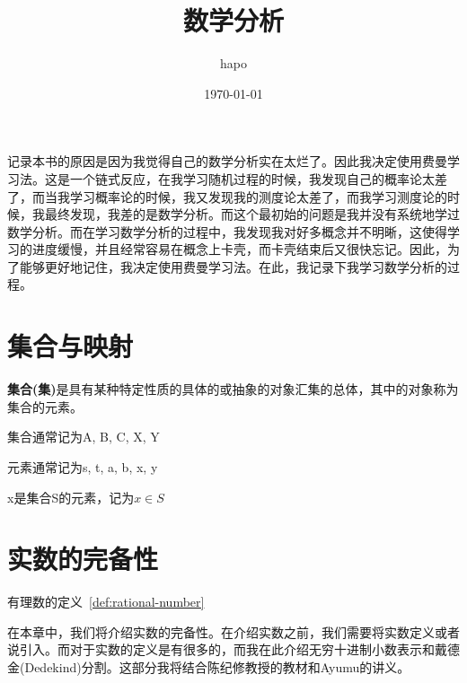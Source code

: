\documentclass[lang=cn]{elegantbook}
\title{数学分析}
\author{hapo}
\date{\today}
\begin{document}
\maketitle
\frontmatter

\tableofcontents

\mainmatter
记录本书的原因是因为我觉得自己的数学分析实在太烂了。因此我决定使用费曼学习法。这是一个链式反应，在我学习随机过程的时候，我发现自己的概率论太差了，而当我学习概率论的时候，我又发现我的测度论太差了，而我学习测度论的时候，我最终发现，我差的是数学分析。而这个最初始的问题是我并没有系统地学过数学分析。而在学习数学分析的过程中，我发现我对好多概念并不明晰，这使得学习的进度缓慢，并且经常容易在概念上卡壳，而卡壳结束后又很快忘记。因此，为了能够更好地记住，我决定使用费曼学习法。在此，我记录下我学习数学分析的过程。
\chapter{集合与映射}
\begin{definition}[集合]
{\bf 集合(集)}是具有某种特定性质的具体的或抽象的对象汇集的总体，其中的对象称为集合的元素。
\end{definition}
集合通常记为A, B, C, X, Y

元素通常记为s, t, a, b, x, y

x是集合S的元素，记为$x\in S$
\chapter{实数的完备性}
\begin{introduction}
  \item 有理数的定义~\ref{def:rational-number}

\end{introduction}
在本章中，我们将介绍实数的完备性。在介绍实数之前，我们需要将实数定义或者说引入。而对于实数的定义是有很多的，而我在此介绍无穷十进制小数表示和戴德金(Dedekind)分割。这部分我将结合陈纪修教授的教材和Ayumu的讲义。
\end{document}
